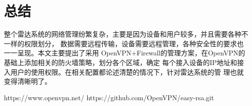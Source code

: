 \documentclass[a4paper,12pt]{report}
\begin{document}
\chapter{总结}
\begin{spacing}{1.5}
整个雷达系统的网络管理纷繁复杂，主要是因为设备和用户较多，并且需要各种不一样的权限划分，
数据需要远程传输，设备需要远程管理，各种安全性的要求也一一呈现。本文主要提出了采用
OpenVPN+Firewall的管理方案，在OpenVPN的基础上添加相关的防火墙策略，划分各个区域，确定
每个接入设备的IP地址和接入用户的使用权限。在相关配置都论述清楚的情况下，针对雷达系统的管
理也就变得清晰明了。
\end{spacing}


\begin{thebibliography}{99}
\songti {} 	
	https://www.openvpn.net/
	https://github.com/OpenVPN/easy-rsa.git
	
\end{thebibliography}

		
\end{document}
